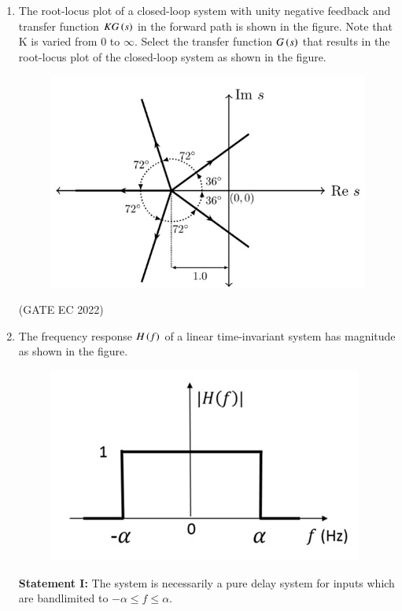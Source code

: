 \documentclass[journal,12pt,onecolumn]{IEEEtran}
\theoremstyle{remark}
\begin{document}
\begin{enumerate}
    \item The root-locus plot of a closed-loop system with unity negative feedback and transfer function $KG\left(s\right)$ in the forward path is shown in the figure. Note that K is varied from 0 to $\infty$.
    Select the transfer function $G\left(s\right)$ that results in the root-locus plot of the closed-loop system as shown in the figure.
    \begin{figure}[H]
        \centering
        \includegraphics[width=0.5\columnwidth]{figs/m11.jpg}
        \caption*{}
        \label{fig:m11}
    \end{figure}

    \hfill{(GATE EC 2022)}
    \begin{enumerate}
    \end{enumerate}

    \item The frequency response $H\left(f\right)$ of a linear time-invariant system has magnitude as shown in the figure.
    \begin{figure}[H]
        \centering
        \includegraphics[width=0.4\columnwidth]{figs/m12.jpg}
        \caption*{}
        \label{fig:m12}
    \end{figure}
    \textbf{Statement I:} The system is necessarily a pure delay system for inputs which are bandlimited to $-\alpha \leq f \leq \alpha$.
    

\end{enumerate}
\end{document}
